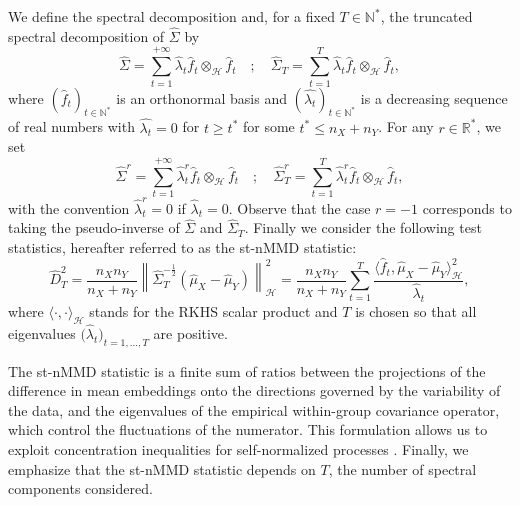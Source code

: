 \documentclass[twoside,11pt]{article}
\newcommand{\Hk}{\mathcal{H}}
\newcommand{\N}{\mathbb{N}}%
\newcommand{\R}{\mathbb{R}}%
\newcommand{\hS}{\widehat{\Sigma}}
\newcommand{\hST}{\widehat{\Sigma}_{T}}
\begin{document}
We define the spectral decomposition and, for a fixed $T \in \mathbb{N^*}$,  the truncated spectral decomposition of $\widehat{\Sigma} $ by
\begin{equation*}
    \hS = \underset{t=1}{\overset{+ \infty}{\sum}} \widehat{\lambda}_t \widehat{f}_t \otimes_{\Hk} \widehat{f}_t \quad ; \quad \hST = \underset{t=1}{\overset{T}{\sum}} \widehat{\lambda}_t \widehat{f}_t \otimes_{\Hk} \widehat{f}_t,
\end{equation*}
where  $(\widehat{f}_t)_{t \in \N^{*}}$ is an orthonormal basis and $(\widehat{\lambda_t})_{t \in \N^{*}}$ is a decreasing sequence of real numbers with $\widehat{\lambda_t}=0$ for $t\geq t^*$ for some $t^* \leq n_X + n_Y$. For any $r \in \R^{*}$, we  set
$$ \hS^{r} = \underset{t=1}{\overset{+ \infty}{\sum}} \widehat{\lambda}_t^{r} \widehat{f}_t \otimes_{\Hk} \widehat{f}_t \quad ; \quad \hST^{r} = \underset{t=1}{\overset{T}{\sum}} \widehat{\lambda}_t^{r} \widehat{f}_t \otimes_{\Hk} \widehat{f}_t,$$
with the convention $\widehat{\lambda}_t^{r}=0$ if $\widehat{\lambda}_t=0$. Observe that the case $r=-1$ corresponds to taking the pseudo-inverse of $\hS$ and $\hST$. Finally we consider the following test statistics, hereafter referred to as the st-nMMD statistic:
\begin{equation}
    \widehat{D}^2_T = \frac{n_X n_Y}{n_X + n_Y}  \left \| \hST^{-\frac{1}{2}} \left(\widehat{\mu}_X - \widehat{\mu}_Y \right)   \right \|_{\Hk}^2 = \frac{n_X n_Y}{n_X + n_Y} \underset{t=1}{\overset{T}{\sum}} \frac{\langle \widehat{f}_t, \widehat{\mu}_X - \widehat{\mu}_Y \rangle_{\Hk}^2}{\widehat{\lambda}_t},
    \label{Hotelling_test_stat}
\end{equation}
where $\langle \cdot , \cdot  \rangle_{\Hk}$ stands for the RKHS scalar product 
and $T$ is chosen so that all eigenvalues $\big(\widehat{\lambda}_t\big)_{t=1,\ldots,T}$ are positive.

The st-nMMD statistic is a finite sum of ratios between the projections of the difference in mean embeddings onto the directions governed by the variability of the data, and the eigenvalues of the empirical within-group covariance operator, which control the fluctuations of the numerator. This formulation allows us to exploit concentration inequalities for self-normalized processes \citep{bertail2008exponential}. Finally, we emphasize that the st-nMMD statistic depends on $T$, the number of spectral components considered.
\end{document}
